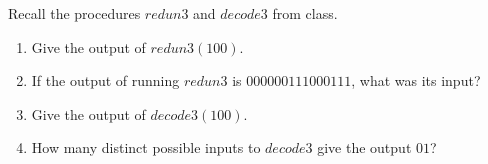 
Recall the procedures $redun3$ and $decode3$ from class.
\begin{enumerate}
\item  Give the output of $redun3(100)$.
\item  If the output of running $redun3$ is $000000111000111$, what was its input?
\item  Give the output of $decode3(100)$.
\item  How many distinct possible inputs to $decode3$ give the output $01$?
\end{enumerate}